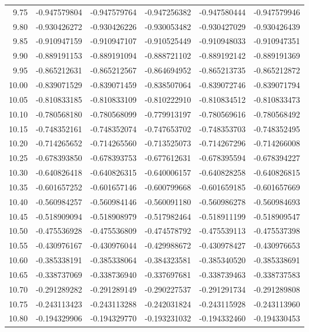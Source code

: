 \documentclass[11pt,a4paper]{article}
\begin{document}
\begin{longtable}{rrrrrr}
9.75 & -0.947579804 & -0.947579764 & -0.947256382 & -0.947580444 & -0.947579946 \\
9.80 & -0.930426272 & -0.930426226 & -0.930053482 & -0.930427029 & -0.930426439 \\
9.85 & -0.910947159 & -0.910947107 & -0.910525449 & -0.910948033 & -0.910947351 \\
9.90 & -0.889191153 & -0.889191094 & -0.888721102 & -0.889192142 & -0.889191369 \\
9.95 & -0.865212631 & -0.865212567 & -0.864694952 & -0.865213735 & -0.865212872 \\
10.00 & -0.839071529 & -0.839071459 & -0.838507064 & -0.839072746 & -0.839071794 \\
10.05 & -0.810833185 & -0.810833109 & -0.810222910 & -0.810834512 & -0.810833473 \\
10.10 & -0.780568180 & -0.780568099 & -0.779913197 & -0.780569616 & -0.780568492 \\
10.15 & -0.748352161 & -0.748352074 & -0.747653702 & -0.748353703 & -0.748352495 \\
10.20 & -0.714265652 & -0.714265560 & -0.713525073 & -0.714267296 & -0.714266008 \\
10.25 & -0.678393850 & -0.678393753 & -0.677612631 & -0.678395594 & -0.678394227 \\
10.30 & -0.640826418 & -0.640826315 & -0.640006157 & -0.640828258 & -0.640826815 \\
10.35 & -0.601657252 & -0.601657146 & -0.600799668 & -0.601659185 & -0.601657669 \\
10.40 & -0.560984257 & -0.560984146 & -0.560091180 & -0.560986278 & -0.560984693 \\
10.45 & -0.518909094 & -0.518908979 & -0.517982464 & -0.518911199 & -0.518909547 \\
10.50 & -0.475536928 & -0.475536809 & -0.474578792 & -0.475539113 & -0.475537398 \\
10.55 & -0.430976167 & -0.430976044 & -0.429988672 & -0.430978427 & -0.430976653 \\
10.60 & -0.385338191 & -0.385338064 & -0.384323581 & -0.385340520 & -0.385338691 \\
10.65 & -0.338737069 & -0.338736940 & -0.337697681 & -0.338739463 & -0.338737583 \\
10.70 & -0.291289282 & -0.291289149 & -0.290227537 & -0.291291734 & -0.291289808 \\
10.75 & -0.243113423 & -0.243113288 & -0.242031824 & -0.243115928 & -0.243113960 \\
10.80 & -0.194329906 & -0.194329770 & -0.193231032 & -0.194332460 & -0.194330453 \\

\end{longtable}
\end{document}
